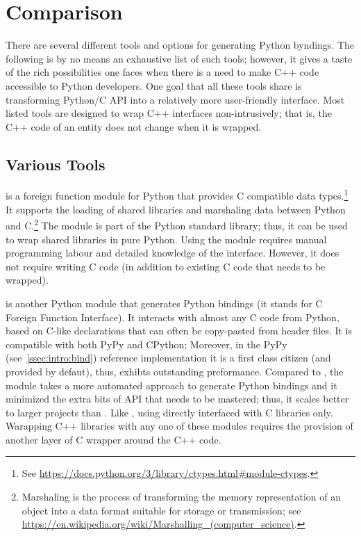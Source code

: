 \section{Comparison}
\label{sec:comp}
There are several different tools and options for generating Python
byndings.  The following is by no means an exhaustive list of such
tools; however, it gives a taste of the rich possibilities one faces
when there is a need to make C++ code accessible to Python developers.
One goal that all these tools share is transforming Python/C API
into a relatively more user-friendly interface.
Most listed tools are designed to wrap C++ interfaces non-intrusively;
that is, the C++ code of an entity does not change when it is wrapped.

\subsection{Various Tools}
\label{ssec:comp:tools}
 is a foreign function module for Python that
provides C compatible data
types.\footnote{See \url{https://docs.python.org/3/library/ctypes.html\#module-ctypes}.}
It supports the loading of shared libraries and marshaling data
between Python and C.\footnote{Marshaling is the process of
transforming the memory representation of an object into a data format
suitable for storage or transmission; see
\url{https://en.wikipedia.org/wiki/Marshalling\_(computer\_science)}.}
The  module is part of the Python standard
library; thus, it can be used to wrap shared libraries in pure Python.
Using the  module requires manual programming
labour and detailed knowledge of the 
interface. However, it does not require writing C code (in addition to
existing C code that needs to be wrapped).

 is another Python module that generates Python
bindings (it stands for C Foreign Function Interface). It interacts
with almost any C code from Python, based on C-like declarations that
can often be copy-pasted from header files. It is compatible with both
PyPy and CPython; Moreover, in the PyPy (see~\ref{ssec:intro:bind})
reference implementation it is a first class citizen (and provided by
defaut), thus, exhibts outstanding preformance. Compared
to , the  module takes a more
automated approach to generate Python bindings and it minimized the
extra bits of API that needs to be mastered; thus, it scales better to
larger projects than . Like ,
using  directly interfaced with C libraries
only. Warapping C++ libraries with any one of these modules requires
the provision of another layer of C wrapper around the C++ code.

